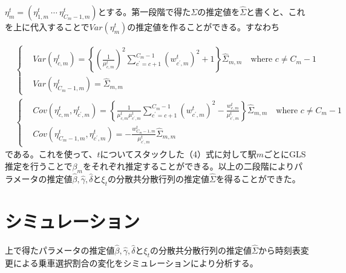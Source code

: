 \documentclass{jsarticle}
\begin{document}
$\eta_m^t = \left( \eta_{1,m}^t\ \cdots\ \eta_{C_m-1, m}^t\right)$とする。第一段階で得た$\Sigma$の推定値を$\hat{\Sigma}$と書くと、これを上に代入することで$Var(\eta_m^t)$の推定値を作ることができる。すなわち

\begin{align*}
&\begin{cases}
	&Var(\eta_{c,m}^t) = \left\{ \left( \frac{1}{\mu_{c,m}^t} \right)^2 \sum_{c^{'} = c+1}^{C_m-1} \left( w_{c^{'},m}^t \right)^2  + 1\right\} \hat{\Sigma}_{m, m} \quad \text{where $c \neq C_m-1$}\\[8pt]
	&Var(\eta_{C_m-1,m}^t) = \hat{\Sigma}_{m,m}
\end{cases}\\[8pt]
&\begin{cases}
	&Cov(\eta_{c,m}^t, \eta_{c^{'},m}^t) = \left\{\frac{1}{\mu_{c,m}^t \mu_{c^{'},m}^t} \sum_{c^{'} = c+1}^{C_m-1} \left( w_{c^{'},m}^t \right)^2  - \frac{w_{c,m}^t}{\mu_{c^{'},m}^t} \right\} \hat{\Sigma}_{m,m}\quad \text{where $c \neq C_m-1$}\\[8pt]
	&Cov(\eta_{C_m-1,m}^t, \eta_{c^{'},m}^t) = -\frac{w_{C_m-1,m}^t}{\mu_{c^{'},m}^t} \hat{\Sigma}_{m,m}
\end{cases}
\end{align*}
である。これを使って、$t$についてスタックした（4）式に対して駅$m$ごとにGLS推定を行うことで$\beta_m$をそれぞれ推定することができる。以上の二段階によりパラメータの推定値$\hat{\beta}, \hat{\gamma}, \hat{\delta}$と$\xi_t$の分散共分散行列の推定値$\hat{\Sigma}$を得ることができた。

\section{シミュレーション}
上で得たパラメータの推定値$\hat{\beta}, \hat{\gamma}, \hat{\delta}$と$\xi_t$の分散共分散行列の推定値$\hat{\Sigma}$から時刻表変更による乗車選択割合の変化をシミュレーションにより分析する。
\end{document}
